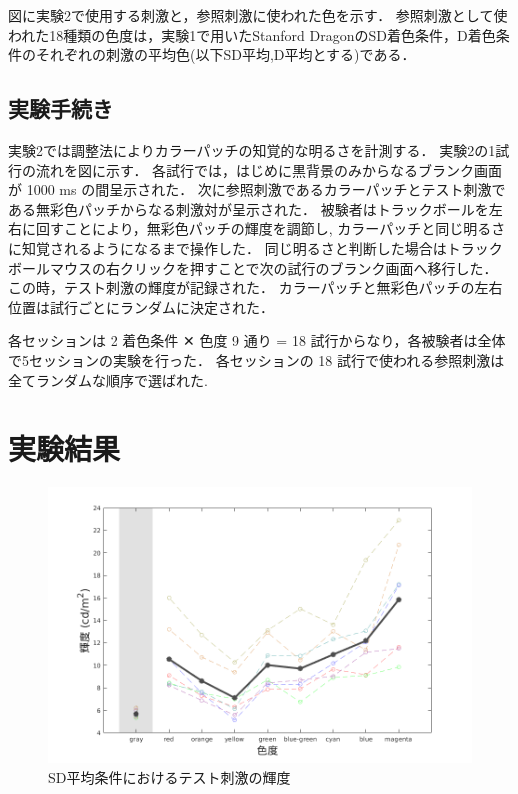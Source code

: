         図に実験2で使用する刺激と，参照刺激に使われた色を示す．
        参照刺激として使われた18種類の色度は，実験1で用いたStanford DragonのSD着色条件，D着色条件のそれぞれの刺激の平均色(以下SD平均,D平均とする)である．

    \subsection{実験手続き}

        実験2では調整法によりカラーパッチの知覚的な明るさを計測する．
        実験2の1試行の流れを図に示す．
        各試行では，はじめに黒背景のみからなるブランク画面が 1000 ms の間呈示された．
        次に参照刺激であるカラーパッチとテスト刺激である無彩色パッチからなる刺激対が呈示された．
        被験者はトラックボールを左右に回すことにより，無彩色パッチの輝度を調節し, カラーパッチと同じ明るさに知覚されるようになるまで操作した．
        同じ明るさと判断した場合はトラックボールマウスの右クリックを押すことで次の試行のブランク画面へ移行した．
        この時，テスト刺激の輝度が記録された．
        カラーパッチと無彩色パッチの左右位置は試行ごとにランダムに決定された．

        各セッションは 2 着色条件 ✕ 色度 9 通り = 18 試行からなり，各被験者は全体で5セッションの実験を行った．
        各セッションの 18 試行で使われる参照刺激は全てランダムな順序で選ばれた.

\section{実験結果}

    \begin{figure}[h]
        \centering
        \includegraphics[width=14.0cm]{./img/ex2_res_SD_p.png}
        \caption{SD平均条件におけるテスト刺激の輝度}
        \label{ex2_SD}
    \end{figure}


